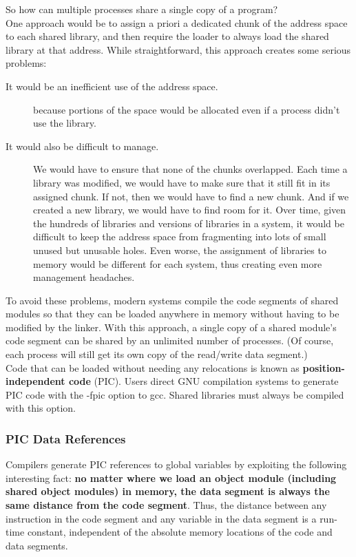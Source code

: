 \documentclass[11pt]{article}
\begin{document}
So how can multiple processes share a single copy of a program?\\
One approach would be to assign a priori a dedicated chunk of the address space to each shared library, and then require the loader to always load the shared library at that address. While straightforward, this approach creates some serious problems:\\
\begin{description}
\item[{It would be an inefficient use of the address space.}] because portions of the space would be allocated even if a process didn’t use the library.\\
\item[{It would also be difficult to manage.}] We would have to ensure that none of the chunks overlapped. Each time a library was modified, we would have to make sure that it still fit in its assigned chunk. If not, then we would have to find a new chunk. And if we created a new library, we would have to find room for it. Over time, given the hundreds of libraries and versions of libraries in a system, it would be difficult to keep the address space from fragmenting into lots of small unused but unusable holes. Even worse, the assignment of libraries to memory would be different for each system, thus creating even more management headaches.\\
\end{description}


To avoid these problems, modern systems compile the code segments of shared modules so that they can be loaded anywhere in memory without having to be modified by the linker. With this approach, a single copy of a shared module’s code segment can be shared by an unlimited number of processes. (Of course, each process will still get its own copy of the read/write data segment.)\\


Code that can be loaded without needing any relocations is known as \textbf{position-independent code} (PIC). Users direct GNU compilation systems to generate PIC code with the -fpic option to gcc. Shared libraries must always be compiled with this option.\\


\subsubsection{PIC Data References}
\label{sec:org104e130}
Compilers generate PIC references to global variables by exploiting the following interesting fact: \textbf{no matter where we load an object module (including shared object modules) in memory, the data segment is always the same distance from the code segment}. Thus, the distance between any instruction in the code segment and any variable in the data segment is a run-time constant, independent of the absolute memory locations of the code and data segments.\\
\end{document}
